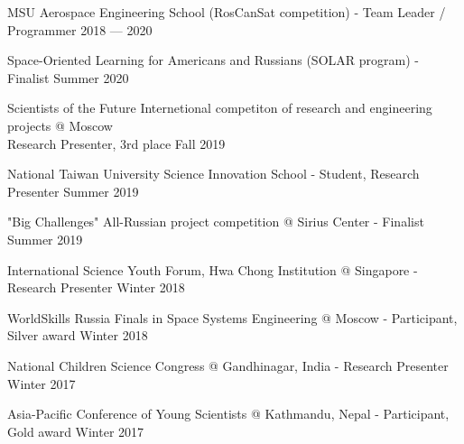 MSU Aerospace Engineering School (RosCanSat competition) - Team Leader / Programmer	\hfill 2018 --- 2020
 
Space-Oriented Learning for Americans and Russians (SOLAR program) - Finalist	\hfill Summer 2020

Scientists of the Future Internetional competiton of research and engineering projects @ Moscow \\ Research Presenter, 3rd place 	\hfill Fall 2019

National Taiwan University Science Innovation School - Student, Research Presenter	\hfill Summer 2019

"Big Challenges" All-Russian project competition @ Sirius Center - Finalist	\hfill Summer 2019

International Science Youth Forum, Hwa Chong Institution @ Singapore - Research Presenter	\hfill Winter 2018

WorldSkills Russia Finals in Space Systems Engineering @ Moscow - Participant, Silver award	\hfill Winter 2018

National Children Science Congress @ Gandhinagar, India - Research Presenter	\hfill Winter 2017

Asia-Pacific Conference of Young Scientists @ Kathmandu, Nepal - Participant, Gold award	\hfill Winter 2017

